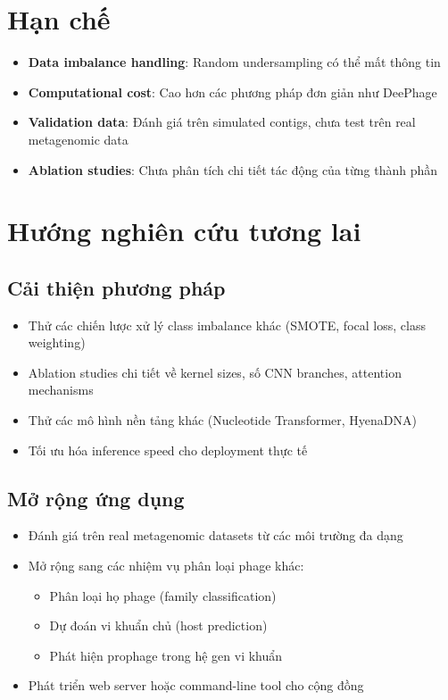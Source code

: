\section{Hạn chế}

\begin{itemize}
    \item \textbf{Data imbalance handling}: Random undersampling có thể mất thông tin
    \item \textbf{Computational cost}: Cao hơn các phương pháp đơn giản như DeePhage
    \item \textbf{Validation data}: Đánh giá trên simulated contigs, chưa test trên real metagenomic data
    \item \textbf{Ablation studies}: Chưa phân tích chi tiết tác động của từng thành phần
\end{itemize}

\section{Hướng nghiên cứu tương lai}

\subsection{Cải thiện phương pháp}

\begin{itemize}
    \item Thử các chiến lược xử lý class imbalance khác (SMOTE, focal loss, class weighting)
    \item Ablation studies chi tiết về kernel sizes, số CNN branches, attention mechanisms
    \item Thử các mô hình nền tảng khác (Nucleotide Transformer, HyenaDNA)
    \item Tối ưu hóa inference speed cho deployment thực tế
\end{itemize}

\subsection{Mở rộng ứng dụng}

\begin{itemize}
    \item Đánh giá trên real metagenomic datasets từ các môi trường đa dạng
    \item Mở rộng sang các nhiệm vụ phân loại phage khác:
    \begin{itemize}
        \item Phân loại họ phage (family classification)
        \item Dự đoán vi khuẩn chủ (host prediction)
        \item Phát hiện prophage trong hệ gen vi khuẩn
    \end{itemize}
    \item Phát triển web server hoặc command-line tool cho cộng đồng
\end{itemize}

